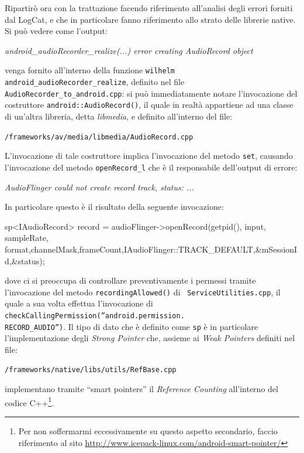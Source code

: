 Ripartirò ora con la trattazione facendo riferimento all'analisi degli errori
forniti dal LogCat, e che in particolare fanno riferimento allo strato delle
librerie native. Si può vedere come l'output:
\begin{center}
\textit{ android\_audioRecorder\_realize(...) error creating AudioRecord object}
\end{center}
venga fornito all'interno della funzione \texttt{\small wilhelm} \texttt{\small android\_audioRecorder\_realize}, 
definito nel file \texttt{\small AudioRecorder\_to\_android.cpp}: si può 
immediatamente notare l'invocazione del costruttore \texttt{\small android::AudioRecord()},
il quale in realtà appartiene ad una classe di un'altra libreria, detta \textit{ libmedia},
e definito all'interno del file:
\begin{center}
\texttt{\small \AOSP/frameworks/av/media/libmedia/AudioRecord.cpp}
\end{center}
L'invocazione di tale costruttore implica l'invocazione del metodo \texttt{set},
causando l'invocazione del metodo \texttt{\small openRecord\_l} che è il responsabile
dell'output di errore:
\begin{center}
\textit{ AudioFlinger could not create record track, status: ...}
\end{center}
In particolare questo è il risultato della seguente invocazione:
\begin{cpp}
sp<IAudioRecord> record = audioFlinger->openRecord(getpid(), input, sampleRate, format,channelMask,frameCount,IAudioFlinger::TRACK_DEFAULT,&mSessionId,&status);
\end{cpp}
dove  ci si preoccupa di controllare preventivamente i permessi tramite
l'invocazione del metodo \texttt{\small recordingAllowed()} di \texttt{\small 
ServiceUtilities.cpp}, il quale a sua volta effettua l'invocazione di 
\texttt{\small checkCallingPermission(''android.permission.\\RECORD\_AUDIO'')}.
Il tipo di dato che è definito come \texttt{\small sp} è in particolare l'implementazione
degli \textit{Strong Pointer} che, assieme ai \textit{Weak Pointers} definiti nel file:
\begin{center}
\texttt{\small \AOSP/frameworks/native/libs/utils/RefBase.cpp}
\end{center}
implementano tramite ``smart pointers'' il \textit{Reference Counting}
all'interno del codice C++\footnote{\label{foot:smart}Per non soffermarmi eccessivamente su 
questo aspetto secondario, faccio riferimento
al sito \url{http://www.icepack-linux.com/android-smart-pointer/}}.
